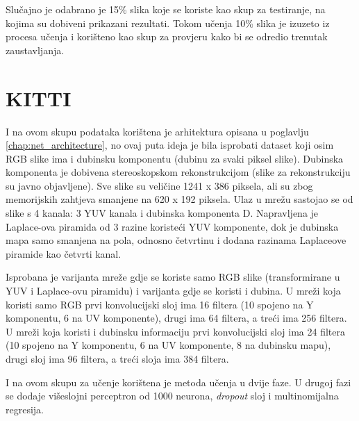 \documentclass[times, utf8, diplomski, numeric]{fer}
\begin{document}
Slučajno je odabrano je 15\% slika koje se koriste kao skup za testiranje, na kojima su dobiveni prikazani rezultati. Tokom učenja 10\% slika je izuzeto iz procesa učenja i korišteno kao skup za provjeru  kako bi se odredio trenutak zaustavljanja.

\section{KITTI}

I na ovom skupu podataka korištena je arhitektura opisana u poglavlju \ref{chap:net_architecture}, no ovaj puta ideja je bila isprobati dataset koji osim RGB slike ima i dubinsku komponentu (dubinu za svaki piksel slike). Dubinska komponenta je dobivena stereoskopskom rekonstrukcijom (slike za rekonstrukciju su javno objavljene). Sve slike su veličine 1241 x 386 piksela, ali su zbog memorijskih zahtjeva smanjene na 620 x 192 piksela. Ulaz u mrežu sastojao se od slike s 4 kanala: 3 YUV kanala i dubinska komponenta D. Napravljena je Laplace-ova piramida od 3 razine koristeći YUV komponente, dok je dubinska mapa samo smanjena na pola, odnosno četvrtinu i dodana razinama Laplaceove piramide kao četvrti kanal.

Isprobana je varijanta mreže gdje se koriste samo RGB slike (transformirane u YUV i Laplace-ovu piramidu) i varijanta gdje se koristi i dubina. U mreži koja koristi samo RGB prvi konvolucijski sloj ima 16 filtera (10 spojeno na Y komponentu, 6 na UV komponente), drugi ima 64 filtera, a treći ima 256 filtera. U mreži koja koristi i dubinsku informaciju prvi konvolucijski sloj ima 24 filtera (10 spojeno na Y komponentu, 6 na UV komponente, 8 na dubinsku mapu), drugi sloj ima 96 filtera, a treći sloja ima 384 filtera.

I na ovom skupu za učenje korištena je metoda učenja u dvije faze. U drugoj fazi se dodaje višeslojni perceptron od 1000 neurona, \textit{dropout} sloj i multinomijalna regresija.
\end{document}
